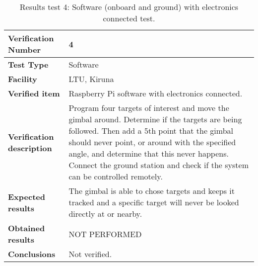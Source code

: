 \begin{table}[H]
\centering

\begin{tabular}{|m{}| m{} |}
\hline
\textbf{Verification Number} 		& 4 				\\ \hline
\textbf{Test Type} 					& Software 			\\ \hline
\textbf{Facility} 					& LTU, Kiruna 		\\ \hline
\textbf{Verified item} 				& Raspberry Pi software with electronics connected. 	\\ \hline

\textbf{Verification description} 	& Program four targets of interest and move the gimbal around. Determine if the targets are being followed. Then add a 5th point that the gimbal should never point, or around with the specified angle, and determine that this never happens. Connect the ground station and check if the system can be controlled remotely. \\ \hline

\textbf{Expected results} 			& The gimbal is able to chose targets and keeps it tracked and a specific target will never be looked directly at or nearby. \\ \hline

\textbf{Obtained results} 			& NOT PERFORMED \\ \hline

\textbf{Conclusions} 				& Not verified.		\\ \hline
\end{tabular}
\caption{Results test 4: Software (onboard and ground) with electronics connected test.}
\label{tab:testresult4:software}
\end{table}


\raggedbottom